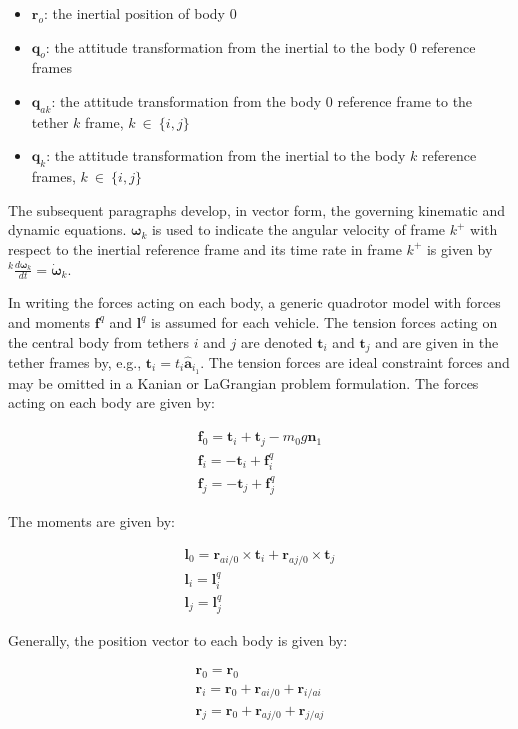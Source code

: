 \documentclass{aiaa-tc}
\newcommand{\fr}[1]{$#1^+$} %
\newcommand{\B}[1]{\textbf{#1}} %
\newcommand{\U}[1]{\hat{\textbf{#1}}} %
\newcommand{\BG}[1]{{\bm #1}}           %
\newcommand{\ddt}[1]{\frac{d#1}{dt}} %
\begin{document}
\begin{itemize}
\item $\B{r}_{o}$: the inertial position of body 0
\item $\B{q}_{o}$: the attitude transformation from the inertial to the body 0 reference frames
\item $\B{q}_{ak}$: the attitude transformation from the body 0 reference frame to the tether $k$ frame, $k \ \in \ \{i,j\}$
\item $\B{q}_{k}$: the attitude transformation from the inertial to the body $k$ reference frames, $k \ \in \ \{i,j\}$
\end{itemize}

The subsequent paragraphs develop, in vector form, the governing kinematic and dynamic equations. $\BG{\omega}_k$ is used to indicate the angular velocity of frame \fr{k} with respect to the inertial reference frame and its time rate in frame \fr{k} is given by ${}^{k}\ddt{\BG{\omega}_k} = \dot{\BG{\omega}}_k$.

In writing the forces acting on each body, a generic quadrotor model with forces and moments $\B{f}^q$ and $\B{l}^q$ is assumed for each vehicle. The tension forces acting on the central body from tethers $i$ and $j$ are denoted $\B{t}_i$ and $\B{t}_j$ and are given in the tether frames by, e.g., $\B{t}_i = t_i \U{a}_{i_1}$. The tension forces are ideal constraint forces and may be omitted in a Kanian or LaGrangian problem formulation. The forces acting on each body are given by:

\begin{align}
\B{f}_0 = \B{t}_i + \B{t}_j - m_0 g \U{n}_1 \\
\B{f}_i = - \B{t}_i + \B{f}^q_i\\
\B{f}_j = - \B{t}_j + \B{f}^q_j
\end{align}

The moments are given by:

\begin{align}
\B{l}_0 = \B{r}_{ai/0} \times \B{t}_i + \B{r}_{aj/0} \times \B{t}_j \\
\B{l}_i = \B{l}^q_i \\
\B{l}_j = \B{l}^q_j
\end{align}

Generally, the position vector to each body is given by:

\begin{align}
\B{r}_0 = \B{r}_0 \\
\B{r}_i = \B{r}_0 + \B{r}_{ai/0} + \B{r}_{i/ai} \\
\B{r}_j = \B{r}_0 + \B{r}_{aj/0} + \B{r}_{j/aj} 
\end{align}
\end{document}
